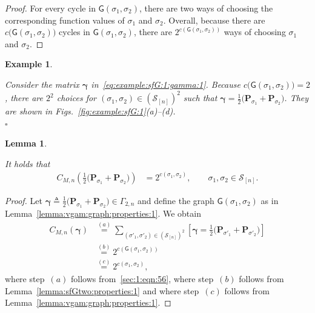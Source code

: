 \documentclass[journal,lettersize,twocolumn]{IEEEtran} %
\newtheorem{lemma}[theorem]{Lemma}
\newtheorem{example}[theorem]{Example}
\newcommand{\eexample}{\hfill$\square$}
\newcommand{\vect}[1]{ \bm{#1} }
\newcommand{\set}[1]{\mathcal{#1}}
\newcommand{\vgam}{ \vect{\gamma} }
\newcommand{\matr}[1]{ \bm{#1} }
\newcommand{\defeq}{ \triangleq }
\newcommand{\setS}{\set{S}}
\newcommand{\CM}[1]{\Cgen{M}{#1}}
\newcommand{\Cgen}[2]{C_{#1,#2}}
\newcommand{\mP}{\matr{P}}
\newcommand{\sfG}{\mathsf{G}}
\newcommand{\Gamtwon}{ \Gamma_{2,n} }
\begin{document}
\begin{appendices}
%

\begin{proof}
  For every cycle in $\sfG(\sigma_1,\sigma_2)$, there are two ways of choosing
  the corresponding function values of $\sigma_1$ and $\sigma_2$. Overall,
  because there are $c\bigl( \sfG(\sigma_1,\sigma_2) \bigr)$ cycles in
  $\sfG(\sigma_1,\sigma_2)$, there are $2^{c(\sfG(\sigma_1,\sigma_2))}$ ways
  of choosing $\sigma_1$ and $\sigma_2$.
\end{proof}

%

\begin{example}
  \label{example:sfG:2}

  Consider the matrix $\vgam$ in~\eqref{eq:example:sfG:1:gamma:1}. Because
  $c\bigl( \sfG(\sigma_1,\sigma_2) \bigr) = 2$, there are $2^2$ choices for
  $(\sigma_1, \sigma_2) \in (\setS_{[n]})^2$ such that
  $\vgam = \frac{1}{2} \bigl( \mP_{\sigma_1} \! + \! \mP_{\sigma_2}
  \bigr)$. They are shown in Figs.~\ref{fig:example:sfG:1}(a)--(d). \\
  \mbox{} \eexample
  
\end{example}

%

\begin{lemma}
  \label{lemma:CMtwo:properties:1}

  It holds that
  \begin{align*}
    \CM{n}
      \left(
        \frac{1}{2} 
        \bigl( 
          \mP_{\sigma_1} \! + \! \mP_{\sigma_2} 
        \bigr)
      \right)
      &= 2^{c(\sigma_1,\sigma_2)}, 
           \qquad \sigma_1, \sigma_2 \in \setS_{[n]}.
  \end{align*}
\end{lemma}

%

\begin{proof}
  Let
  $\vgam \defeq \frac{1}{2} \bigl( \mP_{\sigma_1} \! + \! \mP_{\sigma_2}
  \bigr) \in \Gamtwon$ and define the graph $\sfG(\sigma_1,\sigma_2)$ as in
  Lemma~\ref{lemma:vgam:graph:properties:1}. We obtain
  \begin{align*}
    \CM{n}(\vgam)
      &\overset{(a)}{=}
         \sum_{ (\sigma'_1, \sigma'_2) \in (\setS_{[n]})^2 }
           \left[ 
             \vgam = \frac{1}{2} \bigl( 
                                   \mP_{\sigma'_1} \! + \! \mP_{\sigma'_2} 
                                 \bigr)
           \right] \\
      &\overset{(b)}{=}
         2^{c(\sfG(\sigma_1,\sigma_2))} \\
      &\overset{(c)}{=}
         2^{c(\sigma_1,\sigma_2)},
  \end{align*}
  where step~$(a)$ follows from~\eqref{sec:1:eqn:56}, where step~$(b)$ follows
  from Lemma~\ref{lemma:sfGtwo:properties:1} and where step~$(c)$ follows from
  Lemma~\ref{lemma:vgam:graph:properties:1}.
\end{proof}


\end{appendices}
\end{document}
